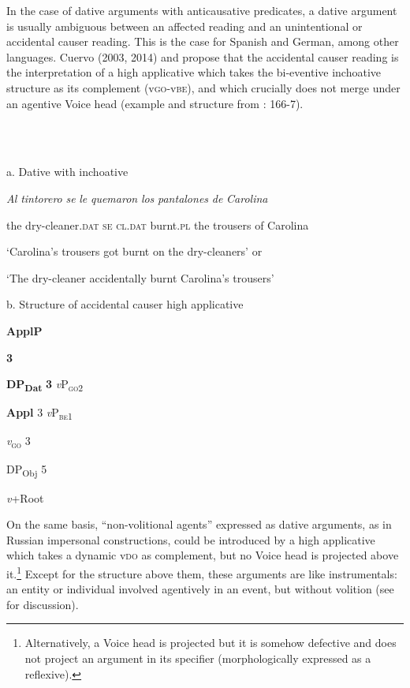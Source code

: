 \documentclass[output=paper,modfonts,nonflat]{langsci/langscibook}
\begin{document}
In the case of dative arguments with anticausative predicates, a dative argument is usually ambiguous between an affected reading and an unintentional or accidental causer reading. This is the case for Spanish and German, among other languages. Cuervo (2003, 2014) and \citet{Schäfer2008} propose that the accidental causer reading is the interpretation of a high applicative which takes the bi-eventive inchoative structure as its complement (v\textsc{go}{}-v\textsc{be}), and which crucially does not merge under an agentive Voice head (example and structure from \citealt{Cuervo2003}: 166-7). 

\ea%
    \label{ex:key:10}
    \gll\\
        \\
    \glt
    \z

           a.   Dative with inchoative

\textit{Al} \textit{tintorero} \textit{se} \textit{le} \textit{quemaron} \textit{los} \textit{pantalones} \textit{de} \textit{Carolina}

  the dry-cleaner\textsc{.dat}   \textsc{se}  \textsc{cl.dat}  burnt.\textsc{pl} the trousers of Carolina

  ‘Carolina’s trousers got burnt on the dry-cleaners’ or

  ‘The dry-cleaner accidentally burnt Carolina’s trousers’    

b.  Structure of accidental causer high applicative

                        \textbf{ApplP}

    \textbf{3} 

  \textbf{DP\textsubscript{Dat}}        \textbf{3} \textit{v}P\textsc{\textsubscript{go}}\textsubscript{2}

                            \textbf{Appl}       3  \textit{v}P\textsc{\textsubscript{be}}\textsubscript{1}

                                                \textit{v}\textsc{\textsubscript{go} }            3 

                                   DP\textsubscript{Obj}         5    

               \textit{v}+Root

On the same basis, “non-volitional agents” expressed as dative arguments, as in Russian impersonal constructions, could be introduced by a high applicative which takes a dynamic v\textsc{do} as complement, but no Voice head is projected above it.\footnote{Alternatively, a Voice head is projected but it is somehow defective and does not project an argument in its specifier (morphologically expressed as a reflexive).}  Except for the structure above them, these arguments are like instrumentals: an entity or individual involved agentively in an event, but without volition (see \citealt{Skorniakova2009} for discussion).
\end{document}
